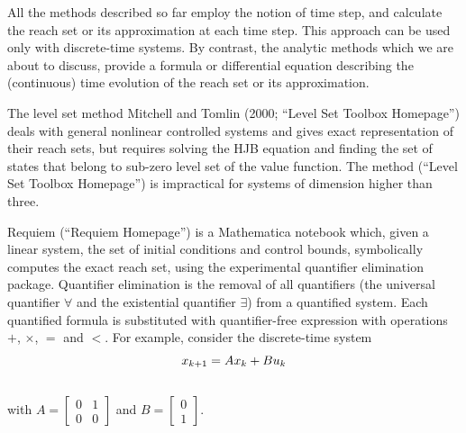 \documentclass[letterpaper,10pt,english]{sphinxmanual}
\begin{document}
All the methods described so far employ the notion of time step, and
calculate the reach set or its approximation at each time step. This
approach can be used only with discrete-time systems. By contrast, the
analytic methods which we are about to discuss, provide a formula or
differential equation describing the (continuous) time evolution of the
reach set or its approximation.

The level set method Mitchell and Tomlin (2000; “Level Set Toolbox
Homepage”) deals with general nonlinear controlled systems and gives
exact representation of their reach sets, but requires solving the HJB
equation and finding the set of states that belong to sub-zero level set
of the value function. The method (“Level Set Toolbox Homepage”) is
impractical for systems of dimension higher than three.

Requiem (“Requiem Homepage”) is a Mathematica notebook which, given a
linear system, the set of initial conditions and control bounds,
symbolically computes the exact reach set, using the experimental
quantifier elimination package. Quantifier elimination is the removal of
all quantifiers (the universal quantifier $\forall$ and the
existential quantifier $\exists$) from a quantified system. Each
quantified formula is substituted with quantifier-free expression with
operations $+$, $\times$, $=$ and $<$. For
example, consider the discrete-time system
\begin{gather}
\begin{split}x_{k+1} = Ax_k + Bu_k\end{split}\notag\\\begin{split}\end{split}\notag
\end{gather}
with $A=\left[\begin{array}{cc}0 & 1\\0 & 0\end{array}\right]$
and $B=\left[\begin{array}{c}0\\1\end{array}\right]$.
\end{document}

